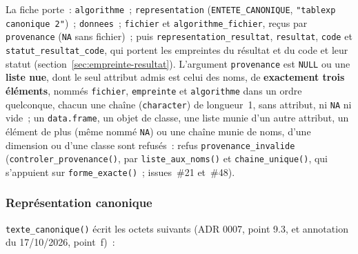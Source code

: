 \documentclass[a4paper,11pt]{article}
\newcommand{\code}[1]{\texttt{\small #1}}
\begin{document}
\medskip
{\sloppy La fiche porte~: \code{algorithme}~; \code{representation}
(\code{ENTETE\_CANONIQUE}, \code{"tablexp canonique 2"})~; \code{donnees}~;
\code{fichier} et \code{algorithme\_fichier}, reçus par \code{provenance}
(\code{NA} sans fichier)~; puis \code{representation\_resultat},
\code{resultat}, \code{code} et \code{statut\_resultat\_code}, qui portent les
empreintes du résultat et du code et leur statut
(section~\ref{sec:empreinte-resultat}). L'argument \code{provenance} est \code{NULL} ou
une \textbf{liste nue}, dont le seul attribut admis est celui des noms, de
\textbf{exactement trois éléments}, nommés \code{fichier}, \code{empreinte}
et \code{algorithme} dans un ordre quelconque, chacun une chaîne
(\code{character}) de longueur~1, sans attribut, ni \code{NA} ni vide~; un
\code{data.frame}, un objet de classe, une liste munie d'un autre attribut,
un élément de plus (même nommé \code{NA}) ou une chaîne munie de noms, d'une
dimension ou d'une classe sont refusés~: refus \code{provenance\_invalide}
(\code{controler\_provenance()}, par \code{liste\_aux\_noms()} et
\code{chaine\_unique()}, qui s'appuient sur \code{forme\_exacte()}~;
issues~\#21 et~\#48).\par}

\subsubsection*{Représentation canonique}

\code{texte\_canonique()} écrit les octets suivants (ADR 0007, point 9.3, et
annotation du 17/10/2026, point~f)~:
\end{document}
